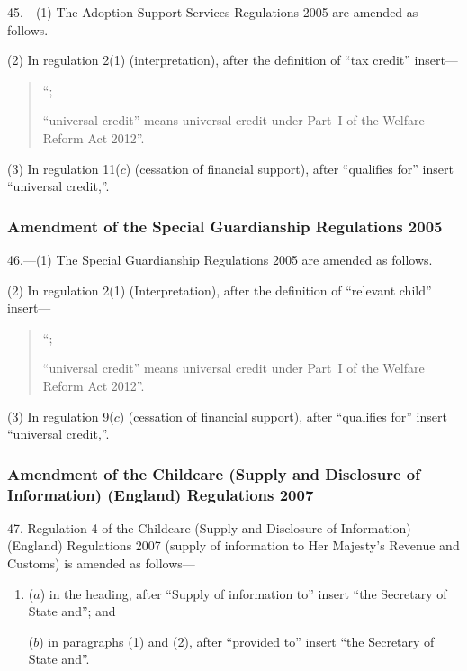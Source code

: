 \documentclass[12pt,a4paper]{article}
\begin{document}
45.—(1) The Adoption Support Services Regulations 2005 are amended as follows.

(2) In regulation 2(1) (interpretation), after the definition of “tax credit” insert—
\begin{quotation}
“;

“universal credit” means universal credit under Part~I of the Welfare Reform Act 2012”.
\end{quotation}

(3) In regulation 11($c$)  (cessation of financial support), after “qualifies for” insert “universal credit,”.

\subsubsection[46. Amendment of the Special Guardianship Regulations 2005]{Amendment of the Special Guardianship Regulations 2005}

46.—(1) The Special Guardianship Regulations 2005 are amended as follows.

(2) In regulation 2(1) (Interpretation), after the definition of “relevant child” insert—
\begin{quotation}
“;

“universal credit” means universal credit under Part~I of the Welfare Reform Act 2012”.
\end{quotation}

(3) In regulation 9($c$)  (cessation of financial support), after “qualifies for” insert “universal credit,”.

\subsubsection[47. Amendment of the Childcare (Supply and Disclosure of Information) (England) Regulations 2007]{Amendment of the Childcare (Supply and Disclosure of Information) (England) Regulations 2007}

47.  Regulation 4 of the Childcare (Supply and Disclosure of Information) (England) Regulations 2007 (supply of information to Her Majesty’s Revenue and Customs) is amended as follows—
\begin{enumerate}\item[]
($a$) in the heading, after “Supply of information to” insert “the Secretary of State and”; and

($b$) in paragraphs (1) and (2), after “provided to” insert “the Secretary of State and”.
\end{enumerate}
\end{document}
